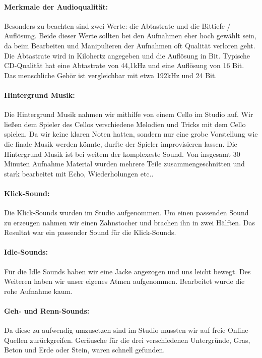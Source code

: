 \paragraph{Merkmale der Audioqualität:}
Besonders zu beachten sind zwei Werte: die Abtastrate und die Bittiefe / Auflösung. Beide dieser Werte sollten bei den Aufnahmen
eher hoch gewählt sein, da beim Bearbeiten und Manipulieren der Aufnahmen oft Qualität verloren geht. Die Abtastrate wird in Kilohertz angegeben und die Auflösung in Bit. Typische
CD-Qualität hat eine Abtastrate von 44,1kHz und eine Auflösung von 16 Bit. Das menschliche Gehör ist vergleichbar mit etwa 192kHz und 24 Bit.

\paragraph{Hintergrund Musik:}
Die Hintergrund Musik nahmen wir mithilfe von einem Cello im Studio auf. Wir ließen dem Spieler des Cellos verschiedene Melodien und Tricks mit dem Cello spielen.
Da wir keine klaren Noten hatten, sondern nur eine grobe Vorstellung wie die finale Musik werden könnte, durfte der Spieler improvisieren lassen.
Die Hintergrund Musik ist bei weitem der komplexeste Sound. Von insgesamt 30 Minuten Aufnahme Material wurden mehrere Teile
zusammengeschnitten und stark bearbeitet mit Echo, Wiederholungen etc..

\paragraph{Klick-Sound:}
Die Klick-Sounds wurden im Studio aufgenommen. Um einen passenden Sound zu erzeugen nahmen wir
einen Zahnstocher und brachen ihn in zwei Hälften. Das Resultat war ein passender Sound für die Klick-Sounds.

\paragraph{Idle-Sounds:}
Für die Idle Sounds haben wir eine Jacke angezogen und uns leicht bewegt. Des Weiteren haben wir unser eigenes Atmen aufgenommen.
Bearbeitet wurde die rohe Aufnahme kaum.

\paragraph{Geh- und Renn-Sounds:}
Da diese zu aufwendig umzusetzen sind im Studio mussten wir auf freie Online-Quellen zurückgreifen.
Geräusche für die drei verschiedenen Untergründe, Gras, Beton und Erde oder Stein, waren schnell gefunden.

